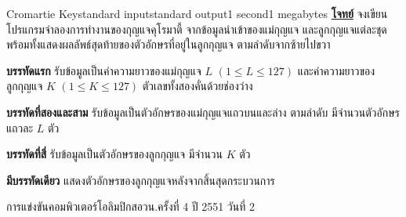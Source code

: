 \documentclass[11pt,a4paper]{article}
\begin{document}
\begin{problem}{Cromartie Key}{standard input}{standard output}{1 second}{1 megabytes}
\bigskip \newpage
\underline{\textbf{โจทย์}}  จงเขียนโปรแกรมจำลองการทำงานของกุญแจคุโรมาตี้ จากข้อมูลนำเข้าของแม่กุญแจ และลูกกุญแจแต่ละชุด พร้อมทั้งแสดงผลลัพธ์สุดท้ายของตัวอักษรที่อยู่ในลูกกุญแจ ตามลำดับจากซ้ายไปขวา

\InputFile

\textbf{บรรทัดแรก} รับข้อมูลเป็นค่าความยาวของแม่กุญแจ $L$ $(1 \leq L \leq 127)$ และค่าความยาวของลูกกุญแจ $K$ $(1 \leq K \leq 127)$ ตัวเลขทั้งสองคั่นด้วยช่องว่าง

\textbf{บรรทัดที่สองและสาม} รับข้อมูลเป็นตัวอักษรของแม่กุญแจแถวบนและล่าง ตามลำดับ มีจำนวนตัวอักษรแถวละ $L$ ตัว

\textbf{บรรทัดที่สี่} รับข้อมูลเป็นตัวอักษรของลูกกุญแจ มีจำนวน $K$ ตัว

\OutputFile

\textbf{มีบรรทัดเดียว} แสดงตัวอักษรของลูกกุญแจหลังจากสิ้นสุดกระบวนการ

\Examples

\begin{example}
%
%
%
\end{example}


\Source

การแข่งขันคอมพิวเตอร์โอลิมปิกสอวน.ครั้งที่ 4 ปี 2551 วันที่ 2


\end{problem}
\end{document}
